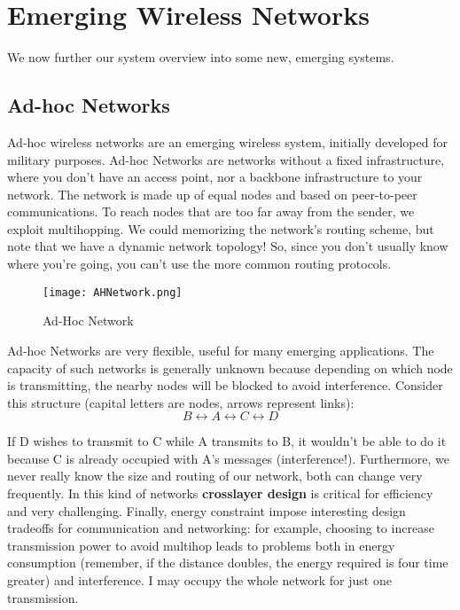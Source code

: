\chapter{Emerging Wireless Networks}
We now further our system overview into some new, emerging systems.

\section{Ad-hoc Networks}
Ad-hoc wireless networks are an emerging wireless system, initially 
developed for military purposes. Ad-hoc Networks are networks without a fixed 
infrastructure, where you don't have an access point, nor a backbone 
infrastructure to your network. The network is made up of equal nodes and based 
on peer-to-peer communications. To reach nodes that are too far away from the 
sender, we exploit multihopping. We could memorizing the network's routing 
scheme, but note that we have a dynamic network topology! So, since you don't 
usually know where you're going, you can't use the more common routing 
protocols. 

\begin{figure}[t]
  \centering
  \texttt{[image: AHNetwork.png]}
  \caption{Ad-Hoc Network}				
  \label{fig:ewn:AHNetwork}
\end{figure}

Ad-hoc Networks are very flexible, useful for many emerging 
applications. The capacity of such networks is generally unknown because 
depending on which node is transmitting, the nearby nodes will be blocked to 
avoid interference. 
Consider this structure (capital letters are nodes, arrows represent 
links):
\begin{equation*}
B \leftrightarrow A \leftrightarrow C \leftrightarrow D
\end{equation*}

If D wishes to transmit to C while A transmits to B, it wouldn't be able 
to do it because C is already occupied with A's messages (interference!).
Furthermore, we never really know the size and routing of our network, 
both can change very frequently.
In this kind of networks \textbf{crosslayer design} is critical for efficiency 
and very challenging.
Finally, energy constraint impose interesting design tradeoffs for 
communication and networking: for example, choosing to increase transmission 
power to avoid multihop leads to problems both in energy consumption (remember, 
if the distance doubles, the energy required is four time greater) and
interference. I may occupy the whole network for just one transmission. 


